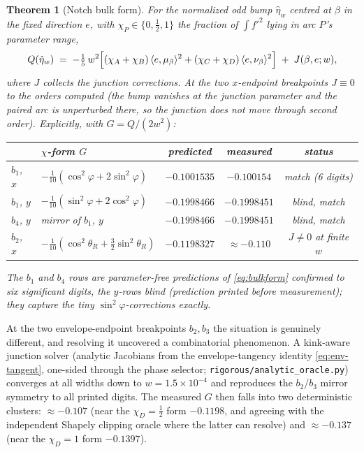 \documentclass[11pt]{amsart}
\theoremstyle{plain}
\newtheorem{theorem}{Theorem}
\theoremstyle{definition}
\begin{document}
\begin{theorem}[Notch bulk form]\label{thm:bulkform}
For the normalized odd bump $\hat\eta_{w}$ centred at $\beta$ in the
fixed direction $e$, with $\chi_{P}\in\{0,\tfrac12,1\}$ the fraction of
$\int f'^{2}$ lying in arc $P$'s parameter range,
\begin{equation}\label{eq:bulkform}
   Q(\hat\eta_{w}) \;=\; -\tfrac15\,w^{2}\Bigl[
      (\chi_{A}+\chi_{B})\,\langle e,\mu_{\beta}\rangle^{2}
    + (\chi_{C}+\chi_{D})\,\langle e,\nu_{\beta}\rangle^{2}\Bigr]
    \;+\; J(\beta,e;w),
\end{equation}
where $J$ collects the junction corrections.  At the two $x$-endpoint
breakpoints $J\equiv0$ to the orders computed (the bump vanishes at the
junction parameter and the paired arc is unperturbed there, so the
junction does not move through second order).  Explicitly, with
$G = Q/(2w^{2})$:
\begin{center}
\begin{tabular}{llccc}
\toprule
 & $\chi$-form $G$ & predicted & measured & status\\
\midrule
$b_{1}$, $x$ & $-\tfrac1{10}(\cos^{2}\varphi + 2\sin^{2}\varphi)$
  & $-0.1001535$ & $-0.100154$ & match (6 digits)\\
$b_{1}$, $y$ & $-\tfrac1{10}(\sin^{2}\varphi + 2\cos^{2}\varphi)$
  & $-0.1998466$ & $-0.1998451$ & \emph{blind}, match\\
$b_{4}$, $y$ & mirror of $b_{1}$, $y$
  & $-0.1998466$ & $-0.1998451$ & \emph{blind}, match\\
$b_{2}$, $x$ & $-\tfrac1{10}(\cos^{2}\theta_{R} + \tfrac32\sin^{2}\theta_{R})$
  & $-0.1198327$ & $\approx-0.110$ & $J\neq0$ at finite $w$\\
\bottomrule
\end{tabular}
\end{center}
The $b_{1}$ and $b_{4}$ rows are parameter-free predictions of
\eqref{eq:bulkform} confirmed to six significant digits, the $y$-rows
\emph{blind} (prediction printed before measurement); they capture the
tiny $\sin^{2}\varphi$-corrections exactly.
\end{theorem}

At the two envelope-endpoint breakpoints $b_{2},b_{3}$ the situation is
genuinely different, and resolving it uncovered a combinatorial
phenomenon.  A kink-aware junction solver (analytic Jacobians from the
envelope-tangency identity \eqref{eq:env-tangent}, one-sided through the
phase selector; \texttt{rigorous/analytic\_oracle.py}) converges at all
widths down to $w=1.5\times10^{-4}$ and reproduces the
$b_{2}$/$b_{3}$ mirror symmetry to all printed digits.  The measured
$G$ then falls into two deterministic clusters:
$\approx-0.107$ (near the $\chi_{D}=\tfrac12$ form $-0.1198$, and
agreeing with the independent Shapely clipping oracle where the latter
can resolve) and $\approx-0.137$ (near the $\chi_{D}=1$ form
$-0.1397$).
\end{document}
